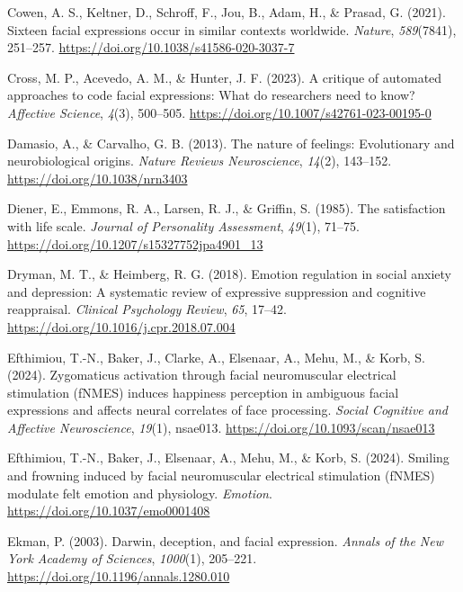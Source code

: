 \documentclass[
  letterpaper,
  DIV=11,
  numbers=noendperiod]{scrartcl}
\newlength{\cslhangindent}
\newenvironment{CSLReferences}[2] %
 {\begin{list}{}{%
  \setlength{\itemindent}{0pt}
  \setlength{\leftmargin}{0pt}
  \setlength{\parsep}{0pt}
  \ifodd #1
   \setlength{\leftmargin}{\cslhangindent}
   \setlength{\itemindent}{-1\cslhangindent}
  \fi
  \setlength{\itemsep}{#2\baselineskip}}}
 {\end{list}}
\begin{document}
\begin{CSLReferences}{1}{0}
Cowen, A. S., Keltner, D., Schroff, F., Jou, B., Adam, H., \& Prasad, G.
(2021). Sixteen facial expressions occur in similar contexts worldwide.
\emph{Nature}, \emph{589}(7841), 251--257.
\url{https://doi.org/10.1038/s41586-020-3037-7}

Cross, M. P., Acevedo, A. M., \& Hunter, J. F. (2023). A critique of
automated approaches to code facial expressions: What do researchers
need to know? \emph{Affective Science}, \emph{4}(3), 500--505.
\url{https://doi.org/10.1007/s42761-023-00195-0}

Damasio, A., \& Carvalho, G. B. (2013). The nature of feelings:
Evolutionary and neurobiological origins. \emph{Nature Reviews
Neuroscience}, \emph{14}(2), 143--152.
\url{https://doi.org/10.1038/nrn3403}

Diener, E., Emmons, R. A., Larsen, R. J., \& Griffin, S. (1985). The
satisfaction with life scale. \emph{Journal of Personality Assessment},
\emph{49}(1), 71--75. \url{https://doi.org/10.1207/s15327752jpa4901_13}

Dryman, M. T., \& Heimberg, R. G. (2018). Emotion regulation in social
anxiety and depression: A systematic review of expressive suppression
and cognitive reappraisal. \emph{Clinical Psychology Review}, \emph{65},
17--42. \url{https://doi.org/10.1016/j.cpr.2018.07.004}

Efthimiou, T.-N., Baker, J., Clarke, A., Elsenaar, A., Mehu, M., \&
Korb, S. (2024). Zygomaticus activation through facial neuromuscular
electrical stimulation ({fNMES}) induces happiness perception in
ambiguous facial expressions and affects neural correlates of face
processing. \emph{Social Cognitive and Affective Neuroscience},
\emph{19}(1), nsae013. \url{https://doi.org/10.1093/scan/nsae013}

Efthimiou, T.-N., Baker, J., Elsenaar, A., Mehu, M., \& Korb, S. (2024).
Smiling and frowning induced by facial neuromuscular electrical
stimulation ({fNMES}) modulate felt emotion and physiology.
\emph{Emotion}. \url{https://doi.org/10.1037/emo0001408}

Ekman, P. (2003). Darwin, deception, and facial expression. \emph{Annals
of the New York Academy of Sciences}, \emph{1000}(1), 205--221.
\url{https://doi.org/10.1196/annals.1280.010}


\end{CSLReferences}
\end{document}
